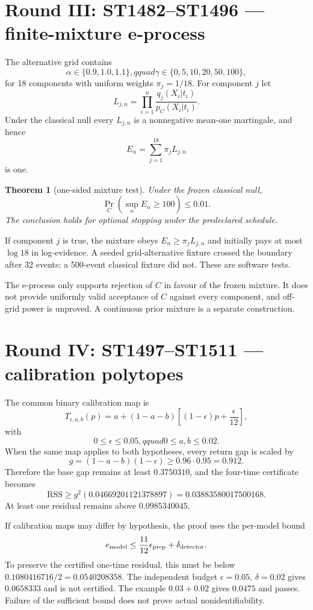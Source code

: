 \documentclass[11pt,a4paper]{article}
\newtheorem{theorem}{Theorem}\newcommand{\status}[1]{\textsf{[#1]}}
\begin{document}
\section{Round III: ST1482--ST1496 --- finite-mixture e-process}

The alternative grid contains
\[
\alpha\in\{0.9,1.0,1.1\},qquad
\gamma\in\{0,5,10,20,50,100\},
\]
for 18 components with uniform weights $\pi_j=1/18$.  For component $j$ let
\[
L_{j,n}=\prod_{i=1}^n\frac{q_j(X_i|t_i)}{p_C(X_i|t_i)}.
\]
Under the classical null every $L_{j,n}$ is a nonnegative mean-one martingale,
and hence
\[
E_n=\sum_{j=1}^{18}\pi_jL_{j,n}
\]
is one.

\begin{theorem}[one-sided mixture test]
Under the frozen classical null,
\[
\Pr_C\left(\sup_nE_n\ge100\right)\le0.01.
\]
The conclusion holds for optional stopping under the predeclared schedule.
\end{theorem}

If component $j$ is true, the mixture obeys $E_n\ge\pi_jL_{j,n}$ and initially
pays at most $\log18$ in log-evidence.  A seeded grid-alternative fixture
crossed the boundary after 32 events; a 500-event classical fixture did not.
These are software tests.

The e-process only supports rejection of $C$ in favour of the frozen mixture.
It does not provide uniformly valid acceptance of $C$ against every component,
and off-grid power is unproved.  A continuous prior mixture is a separate
construction.

\section{Round IV: ST1497--ST1511 --- calibration polytopes}

The common binary calibration map is
\[
T_{\epsilon,a,b}(p)=a+(1-a-b)\left[(1-\epsilon)p+\frac\epsilon{12}\right],
\]
with
\[
0\le\epsilon\le0.05,qquad0\le a,b\le0.02.
\]
When the same map applies to both hypotheses, every return gap is scaled by
\[
g=(1-a-b)(1-\epsilon)\ge0.96\cdot0.95=0.912.
\]
Therefore the base gap remains at least $0.3750310$, and the four-time
certificate becomes
\[
\mathrm{RSS}\ge g^2(0.04669201121378897)
=0.03883580017500168.
\]
At least one residual remains above $0.0985340045$.

If calibration maps may differ by hypothesis, the proof uses the per-model
bound
\[
e_{\rm model}\le\frac{11}{12}\epsilon_{\rm prep}
+\delta_{\rm detector}.
\]
To preserve the certified one-time residual, this must be below
$0.1080416716/2=0.0540208358$.  The independent budget
$\epsilon=0.05$, $\delta=0.02$ gives $0.0658333$ and is not certified.  The
example $0.03+0.02$ gives $0.0475$ and passes.  Failure of the sufficient bound
does not prove actual nonidentifiability.
\end{document}
